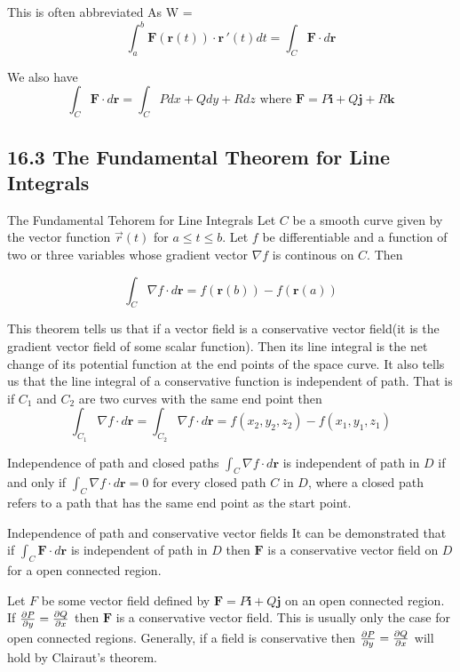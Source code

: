 \documentclass{article}
\begin{document}
	This is often abbreviated As W =
	\[
		\int_{a}^{b} \bm{F}(\bm{r}(t)) \cdot \bm{r}\,'(t) dt = \int_{C} \bm{F}\cdot d
		\bm{r}
	\]

	We also have
	\[
		\int_{C} \bm{F}\cdot d\bm{r}= \int_{C} Pdx + Qdy + Rdz \text{ where }\bm{F}=
		P\bm{i}+ Q\bm{j}+ R\bm{k}
	\]

	\subsection{16.3 The Fundamental Theorem for Line Integrals}

	\begin{mybox}
		{The Fundamental Tehorem for Line Integrals} Let $C$ be a smooth curve given
		by the vector function $\vec{r}(t)$ for $a \leq t \leq b$. Let $f$ be
		differentiable and a function of two or three variables whose gradient
		vector $\nabla f$ is continous on $C$. Then

		\[
			\int_{C} \nabla f \cdot d\bm{r}= f(\bm{r}(b))- f(\bm{r}(a))
		\]
	\end{mybox}

	This theorem tells us that if a vector field is a conservative vector field(it
	is the gradient vector field of some scalar function). Then its line integral is
	the net change of its potential function at the end points of the space curve.
	It also tells us that the line integral of a conservative function is
	independent of path. That is if $C_{1}$ and $C_{2}$ are two curves with the same
	end point then
	\[
		\int_{C_1}\nabla f \cdot d\bm{r}= \int_{C_2}\nabla f \cdot d\bm{r}= f(x_{2},y
		_{2},z_{2}) - f(x_{1},y_{1},z_{1})
	\]

	\begin{mybox}
		{Independence of path and closed paths} $\int_{C}\nabla f \cdot d\bm{r}$ is independent
		of path in $D$ if and only if $\int_{C}\nabla f \cdot d\bm{r}= 0$ for every closed
		path $C$ in $D$, where a closed path refers to a path that has the same end
		point as the start point.
	\end{mybox}

	\begin{mybox}
		{Independence of path and conservative vector fields} It can be demonstrated
		that if $\int_{C}\bm{F}\cdot d\bm{r}$ is independent of path in $D$ then $\bm
		{F}$ is a conservative vector field on $D$ for a open connected region.
	\end{mybox}

	Let $F$ be some vector field defined by $\bm{F}= P\bm{i}+ Q\bm{j}$ on an open
	connected region. If $\pdv{P}{y}= \pdv{Q}{x}$ then $\bm{F}$ is a conservative vector
	field. This is usually only the case for open connected regions. Generally, if
	a field is conservative then $\pdv{P}{y}= \pdv{Q}{x}$ will hold by Clairaut's
	theorem.
\end{document}
